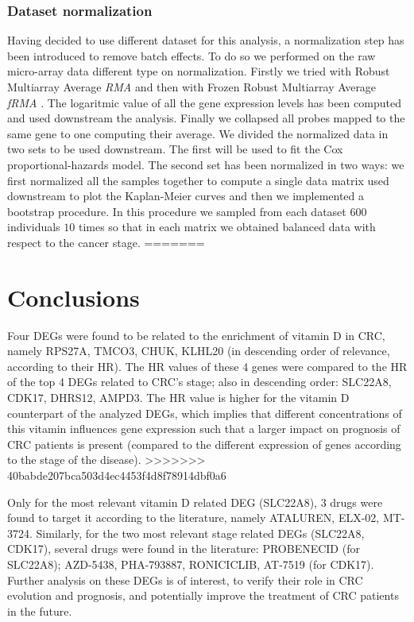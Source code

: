 \documentclass[fleqn,10pt]{SelfArx} %
\begin{document}
		\subsubsection{Dataset normalization}
		Having decided to use different dataset for this analysis, a normalization step has been introduced to remove batch effects.
		To do so we performed on the raw micro-array data different type on normalization.
		Firstly we tried with Robust Multiarray Average \emph{RMA} \cite{rma} and then with Frozen Robust Multiarray Average \emph{fRMA} \cite{frma}.
		The logaritmic value of all the gene expression levels has been computed and used downstream the analysis.
		Finally we collapsed all probes mapped to the same gene to one computing their average.
		We divided the normalized data in two sets to be used downstream.
		The first will be used to fit the Cox proportional-hazards model.
		The second set has been normalized in two ways: we first normalized all the samples together to compute a single data matrix used downstream to plot the Kaplan-Meier curves and then we implemented a bootstrap procedure.
		In this procedure we sampled from each dataset $600$ individuals $10$ times so that in each matrix we obtained balanced data with respect to the cancer stage.
=======
\section{Conclusions}
	Four DEGs were found to be related to the enrichment of vitamin D in CRC, namely RPS27A, TMCO3, CHUK, KLHL20 (in descending order of relevance, according to their HR). The HR values of these 4 genes were compared to the HR of the top 4 DEGs related to CRC’s stage; also in descending order: SLC22A8, CDK17, DHRS12, AMPD3. The HR value is higher for the vitamin D counterpart of the analyzed DEGs, which implies that different concentrations of this vitamin influences gene expression such that a larger impact on prognosis of CRC patients is present (compared to the different expression of genes according to the stage of the disease).
>>>>>>> 40babde207bca503d4ec4453f4d8f78914dbf0a6

	Only for the most relevant vitamin D related DEG (SLC22A8), 3 drugs were found to target it according to the literature, namely ATALUREN, ELX-02, MT-3724. Similarly, for the two most relevant stage related DEGs (SLC22A8, CDK17), several drugs were found in the literature: PROBENECID (for SLC22A8); AZD-5438, PHA-793887, RONICICLIB, AT-7519 (for CDK17). Further analysis on these DEGs is of interest, to verify their role in CRC evolution and prognosis, and potentially improve the treatment of CRC patients in the future.
\end{document}
